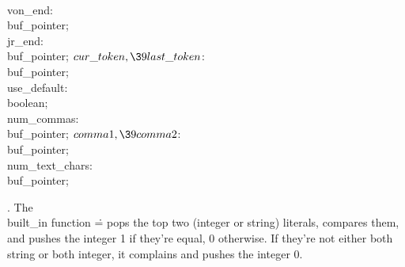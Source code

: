 \4\\{von\_end}: \\{buf\_pointer};\6
\4\\{jr\_end}: \\{buf\_pointer};\6
\4$\\{cur\_token},\39\\{last\_token}$: \\{buf\_pointer};\6
\4\\{use\_default}: \\{boolean};\6
\4\\{num\_commas}: \\{buf\_pointer};\6
\4$\\{comma1},\39\\{comma2}$: \\{buf\_pointer};\6
\4\\{num\_text\_chars}: \\{buf\_pointer};%
\par
\fi

.
The \\{built\_in} function {\.{=}} pops the top two (integer or string)
literals, compares them, and pushes the integer 1 if they're equal, 0
otherwise.  If they're not either both string or both integer, it
complains and pushes the integer 0.

